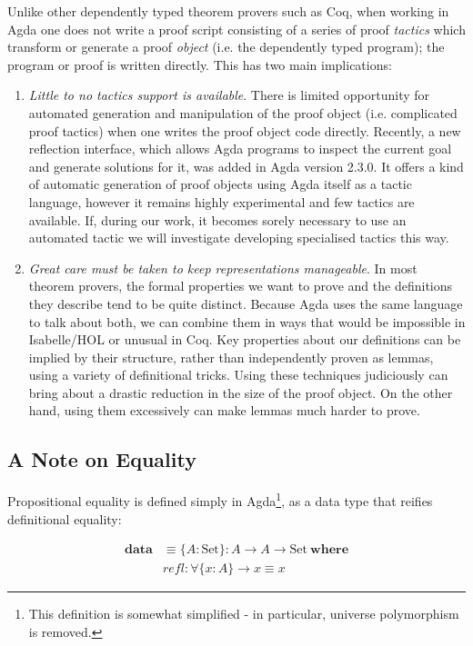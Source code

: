 \documentclass[a4paper]{jfp}
\begin{document}
Unlike other dependently typed theorem provers such as Coq, when working in Agda one does not write a proof script consisting of a series of proof \emph{tactics} which transform or generate a proof \emph{object} (i.e. the dependently typed program); the program or proof is written directly. This has two main implications:
\begin{enumerate}
	\item \emph{Little to no tactics support is available}. There is limited opportunity for automated generation and manipulation of the proof object (i.e. complicated proof tactics) when one writes the proof object code directly. Recently, a new reflection interface, which allows Agda programs to inspect the current goal and generate solutions for it, was added in Agda version 2.3.0. It offers a kind of automatic generation of proof objects using Agda itself as a tactic language, however it remains highly experimental and few tactics are available. If, during our work, it becomes sorely necessary to use an automated tactic we will investigate developing specialised tactics this way.
	\item \emph{Great care must be taken to keep representations manageable}. In most theorem provers, the formal properties we want to prove and the definitions they describe tend to be quite distinct. Because Agda uses the same language to talk about both, we can combine them in ways that would be impossible in Isabelle/HOL or unusual in Coq. Key properties about our definitions can be implied by their structure, rather than independently proven as lemmas, using a variety of definitional tricks. Using these techniques judiciously can bring about a drastic reduction in the size of the proof object.  On the other hand, using them excessively can make lemmas much harder to prove. 
\end{enumerate}

\subsection{A Note on Equality}

Propositional equality is defined simply in Agda\footnote{This definition is somewhat simplified - in particular, universe polymorphism is removed.}, as a data type that reifies definitional equality:

\begin{displaymath}
	\begin{array}{ll}
	\textbf{data} &\! \equiv \{A : \text{Set}\} : A \rightarrow A \rightarrow \text{Set}\ \textbf{where} \\
	              &\! \mathit{refl} : \forall \{x : A\} \rightarrow x \equiv x
    \end{array}
\end{displaymath}
\end{document}
